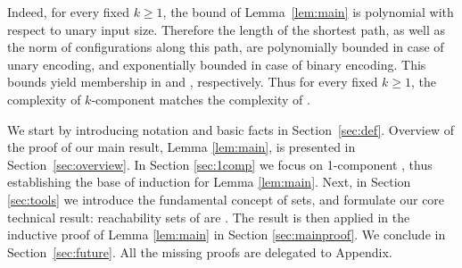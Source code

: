 \noindent
Indeed, for every fixed $k\geq 1$, the bound of Lemma~\ref{lem:main} is polynomial with respect to
unary input size.
Therefore the length of the shortest path, as well as the norm of configurations along this path, are 
polynomially bounded in case of unary encoding,
and exponentially bounded in case of binary encoding.
This bounds yield membership in \nl and \pspace, respectively.
Thus for every fixed $k\geq 1$, the complexity of $k$-component \tvass matches the complexity of \dvass.

%

We start by introducing notation and basic facts in Section~\ref{sec:def}.
Overview of the proof of our main result, Lemma \ref{lem:main}, is presented in Section~\ref{sec:overview}.
In Section \ref{sec:1comp} we focus on 1-component \tvass, thus establishing the base of induction
for Lemma \ref{lem:main}.
Next, in Section \ref{sec:tools} we introduce the fundamental concept of \sandwich sets,
and formulate our core technical result: reachability sets of \dvass
are \sandwich.
The result is then applied in the inductive proof of Lemma \ref{lem:main} in Section \ref{sec:mainproof}.
We conclude in Section~\ref{sec:future}.
All the missing proofs are delegated to Appendix.

